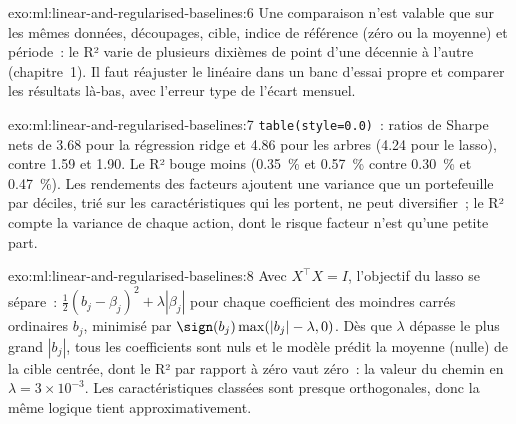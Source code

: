 \begin{solution}{exo:ml:linear-and-regularised-baselines:6}
Une comparaison n'est valable que sur les mêmes données, découpages, cible, indice de référence (zéro ou la moyenne) et période~: le R² varie
de plusieurs dixièmes de point d'une décennie à l'autre (chapitre~1). Il faut réajuster le  linéaire dans un banc d'essai propre et
comparer les résultats là-bas, avec l'erreur type de l'écart mensuel.
\end{solution}

\begin{solution}{exo:ml:linear-and-regularised-baselines:7}
\texttt{table(style=0.0)}~: ratios de Sharpe nets de 3.68 pour la régression ridge et 4.86 pour les arbres (4.24 pour le lasso), contre 1.59
et 1.90. Le R² bouge moins (0.35~\% et 0.57~\% contre 0.30~\% et 0.47~\%). Les rendements des facteurs ajoutent une variance que
un portefeuille par déciles, trié sur les caractéristiques qui les portent, ne peut diversifier~; le R² compte la variance de chaque
action, dont le risque facteur n'est qu'une petite part.
\end{solution}

\begin{solution}{exo:ml:linear-and-regularised-baselines:8}
Avec $X^\top X = I$, l'objectif du lasso se sépare~: $\frac12(b_j - \beta_j)^2 + \lambda|\beta_j|$ pour chaque
coefficient des moindres carrés ordinaires $b_j$, minimisé par $\sign(b_j)\max(|b_j| - \lambda, 0)$. Dès que $\lambda$ dépasse le plus grand $|b_j|$, tous les
coefficients sont nuls et le modèle prédit la moyenne (nulle) de la cible centrée, dont le R² par rapport à zéro vaut zéro~: la valeur du chemin en
$\lambda = 3\times10^{-3}$. Les caractéristiques classées sont presque orthogonales, donc la même logique tient approximativement.
\end{solution}

